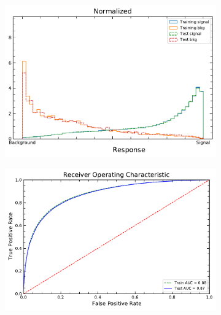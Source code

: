 \begin{figure}[!h] 
  \begin{subfigure}[b]{0.48\linewidth}
    \centering
    \includegraphics[width=0.95\linewidth]{ubonn-thesis/Chapters/Chapters_06/Figure/SR_2j1b/NormalizedResponse_PLV_2j1b_L27_20_10_06Oct2021.pdf} 
    \caption{} 
    \label{SR:2j1b:NNout} 
  \end{subfigure}%
  \vspace*{0.4cm}
  \begin{subfigure}[b]{0.48\linewidth}
    \centering
    \includegraphics[width=\linewidth]{ubonn-thesis/Chapters/Chapters_06/Figure/SR_2j1b/ROC_PLV_2j1b_L27_20_10_06Oct2021.pdf} 
    \caption{} 
    \label{SR:2j1b:ROC} 
  \end{subfigure} 
  \vspace*{0.4cm}

\end{figure}
